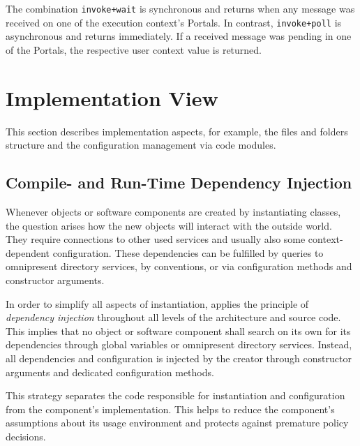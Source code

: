 The combination \texttt{invoke+wait} is synchronous and returns when any message was received on one of the execution context's Portals. In contrast, \texttt{invoke+poll} is asynchronous and returns immediately. If a received message was pending in one of the Portals, the respective user context value is returned.


\section{Implementation View}
\label{sec:global-development-view}

This section describes implementation aspects, for example, the files and folders structure and the configuration management via code modules.

\subsection{Compile- and Run-Time Dependency Injection}
\label{sec:dependency-injection-impl}

Whenever objects or software components are created by instantiating classes, the question arises how the new objects will interact with the outside world. They require connections to other used services and usually also some context-dependent configuration. These dependencies can be fulfilled by queries to omnipresent directory services, by conventions, or via configuration methods and constructor arguments. 

In order to simplify all aspects of instantiation, \mythos applies the principle of \emph{dependency injection} throughout all levels of the architecture and source code. This implies that no object or software component shall search on its own for its dependencies through global variables or omnipresent directory services. Instead, all dependencies and configuration is injected by the creator through constructor arguments and dedicated configuration methods.

This strategy separates the code responsible for instantiation and configuration from the
component's implementation. This helps to reduce the component's assumptions about its usage environment and protects against premature policy decisions.

